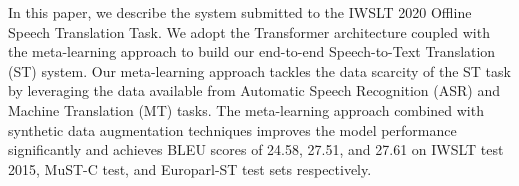 In this paper, we describe the system submitted to the IWSLT 2020 Offline Speech Translation Task. We adopt the Transformer architecture coupled with the meta-learning approach to build our end-to-end Speech-to-Text Translation (ST) system. Our meta-learning approach tackles the data scarcity of the ST task by leveraging the data available from Automatic Speech Recognition (ASR) and Machine Translation (MT) tasks. The meta-learning approach combined with synthetic data augmentation techniques improves the model performance significantly and achieves BLEU scores of 24.58, 27.51, and 27.61 on IWSLT test 2015, MuST-C test, and Europarl-ST test sets respectively.
